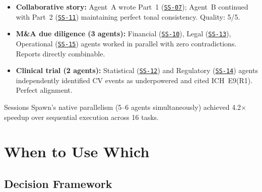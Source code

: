 \documentclass[11pt,twocolumn]{article}
\newcommand{\ghbase}{https://github.com/agenticmail/agenticmail/blob/main/research/agent-rpc-vs-spawn}
\begin{document}
\begin{itemize}[itemsep=2pt,topsep=4pt]
    \item \textbf{Collaborative story:} Agent~A wrote Part~1 (\href{\ghbase/results/07-story-part-a.md}{\texttt{SS-07}}); Agent~B continued with Part~2 (\href{\ghbase/results/11-story-part-b.md}{\texttt{SS-11}}) maintaining perfect tonal consistency. Quality: 5/5.
    \item \textbf{M\&A due diligence (3 agents):} Financial (\href{\ghbase/results/10-ma-finance.md}{\texttt{SS-10}}), Legal (\href{\ghbase/results/13-ma-legal.md}{\texttt{SS-13}}), Operational (\href{\ghbase/results/15-ma-operations.md}{\texttt{SS-15}}) agents worked in parallel with zero contradictions. Reports directly combinable.
    \item \textbf{Clinical trial (2 agents):} Statistical (\href{\ghbase/results/12-clinical-stats.md}{\texttt{SS-12}}) and Regulatory (\href{\ghbase/results/14-clinical-regulatory.md}{\texttt{SS-14}}) agents independently identified CV events as underpowered and cited ICH~E9(R1). Perfect alignment.
\end{itemize}

Sessions Spawn's native parallelism (5--6 agents simultaneously) achieved 4.2$\times$ speedup over sequential execution across 16 tasks.

\section{When to Use Which}

\subsection{Decision Framework}
\end{document}
